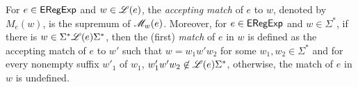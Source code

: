 \begin{definition}
  	For $e \in {\sf ERegExp}$ and $w \in \mathscr{L}(e)$, the \emph{accepting match} of $e$ to $w$, denoted by $M_e(w)$, is the supremum of $\mathscr{M}_w(e)$. Moreover,  for $e \in {\sf ERegExp}$ and $w \in \Sigma^\ast$, if there is $w \in  \Sigma^\ast\mathscr{L}(e)\Sigma^\ast$, then the (first) \emph{match} of $e$ in $w$ is defined as the accepting match of $e$ to $w'$ such that $w = w_1w'w_2$ for some $w_1,w_2\in \Sigma^\ast$ and for every nonempty suffix $w'_1$ of $w_1$, $w'_1w'w_2 \not \in \mathscr{L}(e)\Sigma^\ast$, otherwise, the match of $e$ in $w$ is undefined.  
%  	
  \end{definition}

